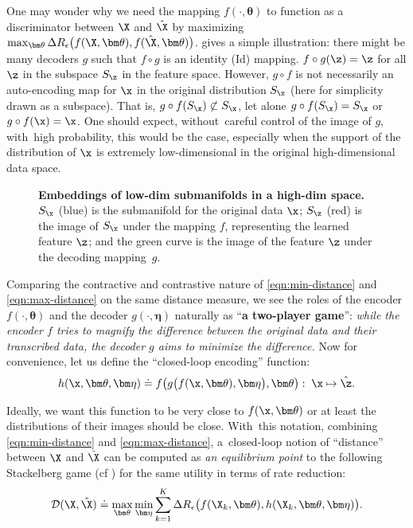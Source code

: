 \documentclass[../../book-main.tex]{subfiles}
\begin{document}
\begin{example}
One may wonder why we need the mapping $f(\cdot, \bm \theta)$ to function as a discriminator between $\X$ and $\hat \X$ by maximizing $\max_{\bm \theta} \Delta R_\epsilon\big(f(\X,\bm \theta), f(\hat \X, \bm \theta)\big)$.  gives a simple illustration: there might be many decoders $g$ such that $f\circ g$ is an identity (Id) mapping. $f\circ g(\z) = \z $ for all $\z$ in the subspace $S_{\z}$ in the feature space. However, $g\circ f$ is not necessarily an auto-encoding map for $\x$ in the original distribution $S_{\x}$ (here for simplicity drawn as a subspace). That is, $g\circ f(S_{\x}) \not\subset S_{\x}$, let alone $g\circ f(S_{\x}) = S_{\x}$ or $g\circ f(\x) = \x$. One should expect, without~careful control of the image of $g$, with~high probability, this would be the case, especially when the support of the distribution of $\x$ is extremely  low-dimensional in the original high-dimensional data space. 
\end{example}
\begin{figure}
\caption{\textbf{{Embeddings} %
 of low-dim submanifolds in a high-dim space.} $S_{\x}$ (blue) is the submanifold for the original data $\x$; $S_{\z}$ (red) is the image of $S_{\x}$ under the mapping $f$, representing the learned feature $\z$; and the green curve  is the image of the feature $\z$ under the decoding \mbox{mapping $g$.} } \label{fig:decoder}
\end{figure} 

Comparing the contractive and contrastive nature of \eqref{eqn:min-distance} and \eqref{eqn:max-distance} on the same distance measure, we see the roles of the encoder $f(\cdot, \bm \theta)$ and the decoder $g(\cdot, \bm \eta)$ naturally as ``{\bf a  two-player game}'': {\em while the encoder $f$ tries to magnify the difference between the original data and their transcribed data, the decoder $g$ aims to minimize the difference.} Now for convenience, let us define the ``closed-loop encoding'' function:
\begin{equation}
    h(\x, \bm \theta,\bm \eta) \doteq f\big(g\big(f(\x, \bm \theta), \bm \eta\big), \bm \theta\big): \; \x \mapsto \hat \z.
\end{equation}

Ideally, we want this function to be very close to $f(\x, \bm \theta)$ or at least the distributions of their images should be close. With~this notation, combining \eqref{eqn:min-distance} and \eqref{eqn:max-distance}, a~closed-loop notion of ``distance'' between $\X$ and $\hat \X$ can be computed as {\em an equilibrium point} to the following Stackelberg game (cf ) for the same utility in terms of rate reduction:%
\begin{equation}
\mathcal{D}(\X, \hat \X) \doteq  \max_{\bm \theta} \min_{\bm \eta} \sum_{k=1}^K \Delta R_\epsilon\big(f(\X_k,\bm \theta), h(\X_k,\bm \theta,\bm \eta)\big).
    \label{eq:MCR2-GAN-pair}
\end{equation}
\end{document}
